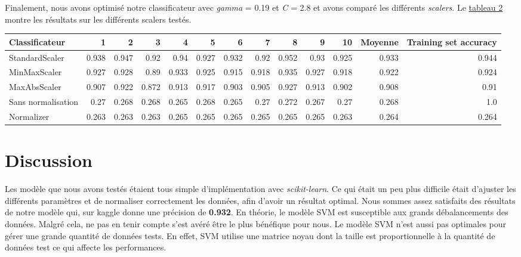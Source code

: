 \documentclass[12pt]{extarticle}
\begin{document}
Finalement, nous avons optimisé notre classificateur avec \emph{gamma} = 0.19 et \emph{C} = 2.8 et avons comparé les différents \emph{scalers}. Le \hyperref[scalers]{tableau 2} montre les résultats sur les différents scalers testés.
\vspace{2mm}
\vspace*{-5mm}
\label{scalers}
{\scriptsize
\begin{center}
\begin{tabular}{|l|r|r|r|r|r|r|r|r|r|r|r|r|}
\hline
Classificateur & 1 & 2 & 3 & 4 & 5 & 6 & 7 & 8 & 9 & 10 & \textbf{Moyenne} & \textbf{Training set accuracy}\\
\hline
StandardScaler & 0.938 & 0.947 & 0.92 & 0.94 & 0.927 & 0.932 & 0.92 & 0.952 & 0.93 & 0.925 & 0.933 & 0.944\\
\hline
MinMaxScaler & 0.927 & 0.928 & 0.89 & 0.933 & 0.925 & 0.915 & 0.918 & 0.935 & 0.927 & 0.918 & 0.922 & 0.924\\
\hline
MaxAbsScaler & 0.907 & 0.922 & 0.872 & 0.913 & 0.917 & 0.903 & 0.905 & 0.927 & 0.913 & 0.902 & 0.908 & 0.91\\
\hline
Sans normalisation & 0.27 & 0.268 & 0.268 & 0.265 & 0.268 & 0.265 & 0.27 & 0.272 & 0.267 & 0.27 & 0.268 & 1.0\\
\hline
Normalizer & 0.263 & 0.263 & 0.263 & 0.265 & 0.265 & 0.265 & 0.265 & 0.265 & 0.265 & 0.263 & 0.264 & 0.264\\
\hline
\end{tabular}
\end{center}
}

\section{Discussion}
\label{sec:org08960de}
\setlength\parindent{20pt}Les modèle que nous avons testés étaient tous simple d'implémentation avec \emph{scikit-learn}. Ce qui était un peu plus difficile était d'ajuster les différents paramètres et de normaliser correctement les données, afin d'avoir un résultat optimal. Nous sommes assez satisfaits des résultats de notre modèle qui, sur kaggle donne une précision de \textbf{0.932}. En théorie, le modèle SVM est susceptible aux grands débalancements des données. Malgré cela, ne pas en tenir compte s'est avéré être le plus bénéfique pour nous. Le modèle SVM n'est aussi pas optimales pour gérer une grande quantité de données tests. En effet, SVM utilise une matrice noyau dont la taille est proportionnelle à la quantité de données test ce qui affecte les performances.
\end{document}
